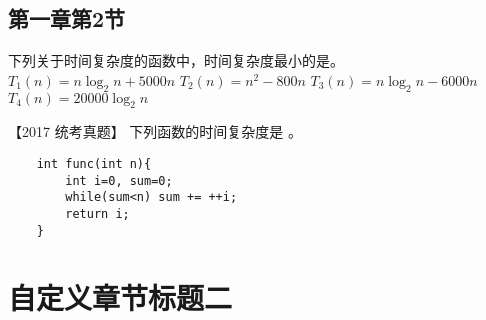 \subsection{第一章第2节}

\begin{questions}[tr]

    \begin{bbox}
        \question   下列关于时间复杂度的函数中，时间复杂度最小的是\blankbox 。
        \fourchoices
        {$T_1(n)=n\log_2n +5000n$}
        {$T_2(n)=n^2 - 800n$}
        {$T_3(n)=n\log_2n - 6000n$}
        {$T_4(n)=20000\log_2n$}
    \end{bbox}

    \begin{bbox}
        \question   【2017 统考真题】 下列函数的时间复杂度是 \blankbox 。
        \begin{lstlisting}
    int func(int n){
        int i=0, sum=0;
        while(sum<n) sum += ++i;
        return i;
    }
        \end{lstlisting}
    \end{bbox}

\end{questions}

\section{自定义章节标题二}

